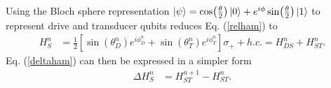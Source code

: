 Using the Bloch sphere representation $\ket{\psi} = \cos(\frac{\theta}{2}) \ket{0} + e^{i \phi} \sin(\frac{\theta}{2})\ket{1}$ to represent drive and transducer qubits reduces Eq. (\ref{relham}) to
\begin{align}
H_S^n &= \frac{1}{2} \left[\sin(\theta_D^n) e^{i\phi_D^n} + \sin(\theta_T^n) e^{i\phi_T^n}\right] \sigma_{+} + h.c. =  H_{DS}^n + H_{ST}^n. \nonumber
\end{align}
Eq. (\ref{deltaham}) can then be expressed in a simpler form
\begin{align}
\Delta H_S^n &= H_{ST}^{n+1} - H_{ST}^n. \label{simpledeltaham}
\end{align}